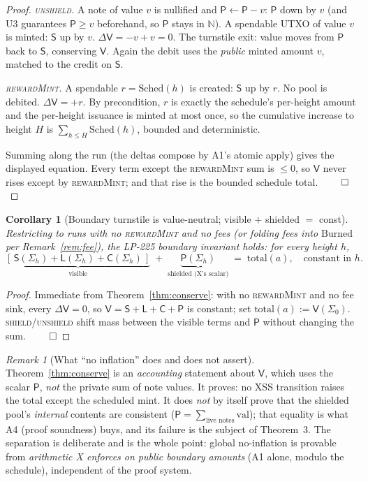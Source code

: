 \documentclass[11pt]{article}
\newtheorem{corollary}[theorem]{Corollary}
\theoremstyle{definition}
\theoremstyle{remark}
\newtheorem{remark}{Remark}
\newcommand{\Val}{\mathsf{V}}
\newcommand{\spend}{\mathsf{S}}
\newcommand{\lock}{\mathsf{L}}
\newcommand{\commit}{\mathsf{C}}
\newcommand{\pool}{\mathsf{P}}
\newcommand{\total}{\mathrm{total}}
\begin{document}
\begin{proof}
\emph{\textsc{unshield}.} A note of value $v$ is nullified and $\pool\gets
\pool-v$: $\pool$ down by $v$ (and U3 guarantees $\pool\ge v$ beforehand, so
$\pool$ stays in $\mathbb{N}$). A spendable UTXO of value $v$ is minted:
$\spend$ up by $v$. $\Delta\Val = -v + v = 0$. The turnstile exit: value
moves from $\pool$ back to $\spend$, conserving $\Val$. Again the debit uses
the \emph{public} minted amount $v$, matched to the credit on $\spend$.

\emph{\textsc{rewardMint}.} A spendable $r=\mathrm{Sched}(h)$ is created:
$\spend$ up by $r$. No pool is debited. $\Delta\Val = +r$. By precondition,
$r$ is exactly the schedule's per-height amount and the per-height issuance
is minted at most once, so the cumulative increase to height $H$ is
$\sum_{h\le H}\mathrm{Sched}(h)$, bounded and deterministic.

Summing along the run (the deltas compose by A1's atomic apply) gives the
displayed equation. Every term except the \textsc{rewardMint} sum is
$\le 0$, so $\Val$ never rises except by \textsc{rewardMint}; and that rise
is the bounded schedule total. $\qed$
\end{proof}

\begin{corollary}[Boundary turnstile is value-neutral; visible $+$ shielded $=$ const]
\label{cor:turnstile}
Restricting to runs with no \textsc{rewardMint} and no fees (or folding fees
into $\mathrm{Burned}$ per Remark~\ref{rem:fee}), the LP-225 boundary
invariant holds: for every height $h$,
\[
  \underbrace{[\,\spend(\Sigma_h)+\lock(\Sigma_h)+\commit(\Sigma_h)\,]}_{\text{visible}}
  \;+\; \underbrace{\pool(\Sigma_h)}_{\text{shielded (X's scalar)}}
  \;=\; \total(a),\quad\text{constant in }h.
\]
\end{corollary}
\begin{proof}
Immediate from Theorem~\ref{thm:conserve}: with no \textsc{rewardMint} and
no fee sink, every $\Delta\Val=0$, so $\Val=\spend+\lock+\commit+\pool$ is
constant; set $\total(a):=\Val(\Sigma_0)$. \textsc{shield}/\textsc{unshield}
shift mass between the visible terms and $\pool$ without changing the sum.
$\qed$
\end{proof}

\begin{remark}[What ``no inflation'' does and does not assert]
\label{rem:t2scope}
Theorem~\ref{thm:conserve} is an \emph{accounting} statement about $\Val$,
which uses the scalar $\pool$, \emph{not} the private sum of note values. It
proves: no XSS transition raises the total except the scheduled mint. It
does \emph{not} by itself prove that the shielded pool's \emph{internal}
contents are consistent ($\pool=\sum_{\text{live notes}}\mathrm{val}$); that
equality is what A4 (proof soundness) buys, and its failure is the subject
of Theorem~3. The separation is deliberate and is the whole point: global
no-inflation is provable from \emph{arithmetic X enforces on public boundary
amounts} (A1 alone, modulo the schedule), independent of the proof system.
\end{remark}
\end{document}
